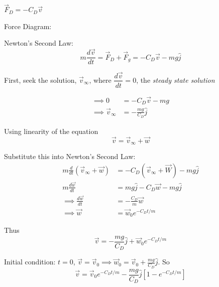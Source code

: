 \documentclass[10pt]{scrartcl}
\begin{document}
\begin{example}
\begin{center}
\end{center}

$\vec{F}_D = -C_D\vec{v}$

Force Diagram:

\begin{center}
\end{center}


Newton's Second Law:
\[m\frac{d\vec{v}}{dt} = \vec{F}_D + \vec{F}_g = -C_D\vec{v} - mg\hat{j}\]

First, seek the solution, $\vec{v}_{\infty}$, where $\dfrac{d\vec{v}}{dt} = 0$, the \emph{steady state solution}

\[
\begin{aligned}
\implies 0 &=  -C_D\vec{v} - mg\\
\implies \vec{v}_{\infty} &= -\frac{mg}{C_D}\hat{j}
\end{aligned}\]

Using linearity of the equation
\[\vec{v} = \vec{v}_{\infty} + \vec{w}\]

Substitute this into Newton's Second Law:
\[\begin{aligned}
m\frac{d}{dt}(\vec{v}_{\infty} + \vec{w}) &= -C_D(\vec{v}_{\infty} + \vec{W}) - mg\hat{j}\\
m\frac{d\vec{w}}{dt} &= mg\hat{j} -C_D\vec{w} - mg\hat{j}\\
\implies \frac{d\vec{w}}{dt} &= -\frac{C_D}{m}\vec{w} \\
\implies \vec{w} &= \vec{w}_0e^{-C_Dt/m}
\end{aligned}\]

Thus 
\[\vec{v} = -\frac{mg}{C_D}\hat{j} + \vec{w}_0e^{-C_Dt/m}\]

Initial condition: $t= 0$, $\vec{v} = \vec{v}_0 \implies \vec{w}_0 = \vec{v}_0 + \frac{mg}{C_D}\hat{j}$. So
\[\vec{v} = \vec{v}_0e^{-C_Dt/m} - \frac{mg}{C_D}\hat{j}[1-e^{-C_Dt/m}]\]


\end{example}
\end{document}
